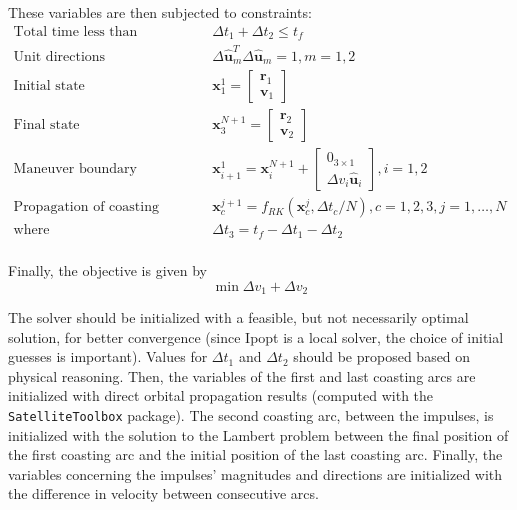 These variables are then subjected to constraints:
\begin{align}
    \text{Total time less than transfer time} &\qquad\Delta t_1 + \Delta t_2 \leq t_f \\
    \text{Unit directions} &\qquad\Delta \hat{\mathbf{u}}_m^T \Delta \hat{\mathbf{u}}_m = 1, m = 1, 2 \\
    \text{Initial state} &\qquad \mathbf{x}_1^{1} = \begin{bmatrix}
        \mathbf{r}_1 \\ \mathbf{v}_1
    \end{bmatrix} \\
    \text{Final state} &\qquad \mathbf{x}_3^{N+1} = \begin{bmatrix}
        \mathbf{r}_2 \\ \mathbf{v}_2
    \end{bmatrix} \\
    \text{Maneuver boundary conditions} &\qquad \mathbf{x}_{i+1}^{1} = \mathbf{x}_i^{N+1} + \begin{bmatrix}
        0_{3\times1} \\ \Delta v_i \hat{\mathbf{u}}_i
    \end{bmatrix}, i=1, 2 \\
    \text{Propagation of coasting arcs} &\qquad \mathbf{x}_c^{j+1} = f_{RK}(\mathbf{x}_c^j, \Delta t_c / N), c=1, 2, 3, j=1,\dots,N \\
    \text{where} & \qquad \Delta t_3 = t_f - \Delta t_1 - \Delta t_2 \\
\end{align}

Finally, the objective is given by
\begin{equation}
    \min \Delta v_1 + \Delta v_2
\end{equation}

The solver should be initialized with a feasible, but not necessarily optimal solution, for better convergence (since Ipopt is a local solver, the choice of initial guesses is important). Values for \(\Delta t_1\) and \(\Delta t_2\) should be proposed based on physical reasoning. Then, the variables of the first and last coasting arcs are initialized with direct orbital propagation results (computed with the \texttt{SatelliteToolbox} package). The second coasting arc, between the impulses, is initialized with the solution to the Lambert problem between the final position of the first coasting arc and the initial position of the last coasting arc. Finally, the variables concerning the impulses' magnitudes and directions are initialized with the difference in velocity between consecutive arcs.

